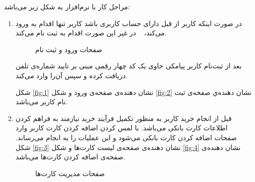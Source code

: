 \documentclass[oneside]{report}
\begin{document}
مراحل کار با نرم‌افزار به شکل زیر می‌باشد:
\begin{enumerate}
	\item در صورت اینکه کاربر از قبل دارای حساب کاربری باشد کاربر تنها اقدام به ورود می‌کند،
	در غیر این صورت اقدام به ثبت نام می‌کند.  
	
	\begin{figure}[h!]
		\begin{center}
			
		\caption{صفحات ورود و ثبت نام }
\end{center}
	\end{figure}
	
	بعد از ثبت‌نام کاربر پیامکی حاوی یک کد چهار رقمی مبنی   بر تایید شماره‌ی تلفن دریافت کرده و سپس آن‌را وارد می‌کند.
	
	شکل 
	\ref{fig:1}
	نشان دهنده‌ی صفحه‌ی ورود و شکل 
	\ref{fig:2}
	نشان دهنده‌ي صفحه‌ی ثبت نام کاربر می‌باشد.
	
\newpage

	\item قبل از انجام خرید کاربر به منظور تکمیل فرآیند خرید نیازمند به فراهم کردن اطلاعات کارت بانکی می‌باشد. با لمس کردن اضافه کردن کارت کاربر وارد صفحات اضافه کردن کارت بانکی می‌شود و این عملیات را به انجام می‌رساند.
	شکل 
	\ref{fig:3}
	نشان دهنده‌ی صفحه‌ی لیست کارت‌ها و شکل
	\ref{fig:4}
	نشان دهنده‌ی صفحه‌ی اضافه کردن کارت‌ها می‌باشد.
	\begin{figure}[h!]
	\begin{center}
		\caption{صفحات مدیریت کارت‌ها}
	\end{center}
\end{figure}

\newpage


\end{enumerate}
\end{document}
